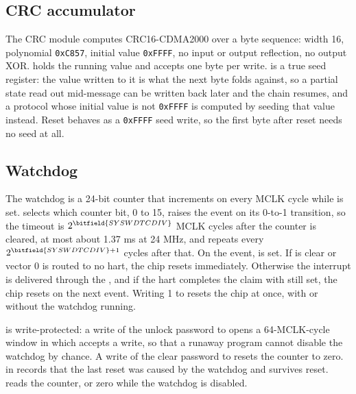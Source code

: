 \subsection{CRC accumulator}

The CRC module computes CRC16-CDMA2000 over a byte sequence: width 16, polynomial \texttt{0xC857}, initial value \texttt{0xFFFF}, no input or output reflection, no output XOR.  holds the running value and  accepts one byte per write.  is a true seed register: the value written to it is what the next  byte folds against, so a partial state read out mid-message can be written back later and the chain resumes, and a protocol whose initial value is not \texttt{0xFFFF} is computed by seeding that value instead. Reset behaves as a \texttt{0xFFFF} seed write, so the first byte after reset needs no seed at all.

\subsection{Watchdog}

The watchdog is a 24-bit counter that increments on every MCLK cycle while  is set.  selects which counter bit, 0 to 15, raises the event on its 0-to-1 transition, so the timeout is $2^{\bitfield{SYSWDTCDIV}}$ MCLK cycles after the counter is cleared, at most about 1.37 \si{\milli\second} at 24 MHz, and repeats every $2^{\bitfield{SYSWDTCDIV} + 1}$ cycles after that. On the event,  is set. If  is clear or vector 0 is routed to no hart, the chip resets immediately. Otherwise the interrupt is delivered through the , and if the hart completes the claim with  still set, the chip resets on the next event. Writing 1 to  resets the chip at once, with or without the watchdog running.

 is write-protected: a write of the unlock password \texttt{\WdtUnlockPassword} to  opens a 64-MCLK-cycle window in which  accepts a write, so that a runaway program cannot disable the watchdog by chance. A write of the clear password \texttt{\WdtClearPassword} to  resets the counter to zero.  in  records that the last reset was caused by the watchdog and survives reset.  reads the counter, or zero while the watchdog is disabled.

